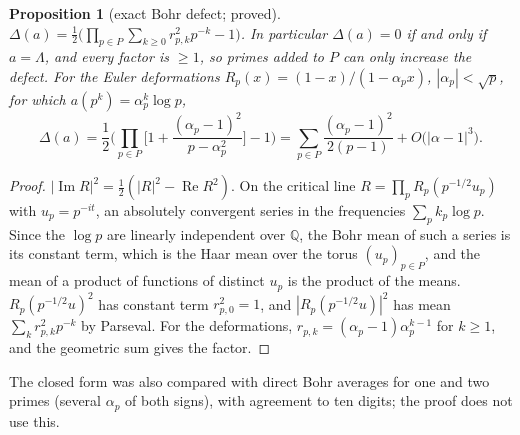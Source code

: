 \documentclass[11pt]{amsart}
\newtheorem{proposition}[theorem]{Proposition}
\theoremstyle{definition}
\theoremstyle{remark}
\newcommand{\Q}{\mathbb Q}
\newcommand{\Rel}{\operatorname{Re}}
\newcommand{\Iml}{\operatorname{Im}}
\begin{document}
\begin{proposition}[exact Bohr defect; proved]\label{prop:geo-bohr}
$\Delta(a)=\frac12\big(\prod_{p\in P}\sum_{k\ge0}r_{p,k}^2p^{-k}-1\big)$. In particular $\Delta(a)=0$ if and only if $a=\Lambda$, and every
factor is $\ge1$, so primes added to $P$ can only increase the defect. For the Euler deformations
$R_p(x)=(1-x)/(1-\alpha_px)$, $|\alpha_p|<\sqrt p$, for which $a(p^k)=\alpha_p^k\log p$,
\[
\Delta(a)=\frac12\Big(\prod_{p\in P}\Big[1+\frac{(\alpha_p-1)^2}{p-\alpha_p^2}\Big]-1\Big)
=\sum_{p\in P}\frac{(\alpha_p-1)^2}{2(p-1)}+O\big(|\alpha-1|^3\big).
\]
\end{proposition}
\begin{proof}
$|\Iml R|^2=\frac12(|R|^2-\Rel R^2)$. On the critical line $R=\prod_pR_p(p^{-1/2}u_p)$ with $u_p=p^{-it}$, an absolutely convergent
series in the frequencies $\sum_pk_p\log p$. Since the $\log p$ are linearly independent over $\Q$, the Bohr mean of such a series is
its constant term, which is the Haar mean over the torus $(u_p)_{p\in P}$, and the mean of a product of functions of distinct $u_p$ is
the product of the means. $R_p(p^{-1/2}u)^2$ has constant term $r_{p,0}^2=1$, and $|R_p(p^{-1/2}u)|^2$ has mean $\sum_kr_{p,k}^2p^{-k}$ by
Parseval. For the deformations, $r_{p,k}=(\alpha_p-1)\alpha_p^{k-1}$ for $k\ge1$, and the geometric sum gives the factor.
\end{proof}

The closed form was also compared with direct Bohr averages for one and two primes (several $\alpha_p$ of both signs), with agreement
to ten digits; the proof does not use this.
\end{document}
